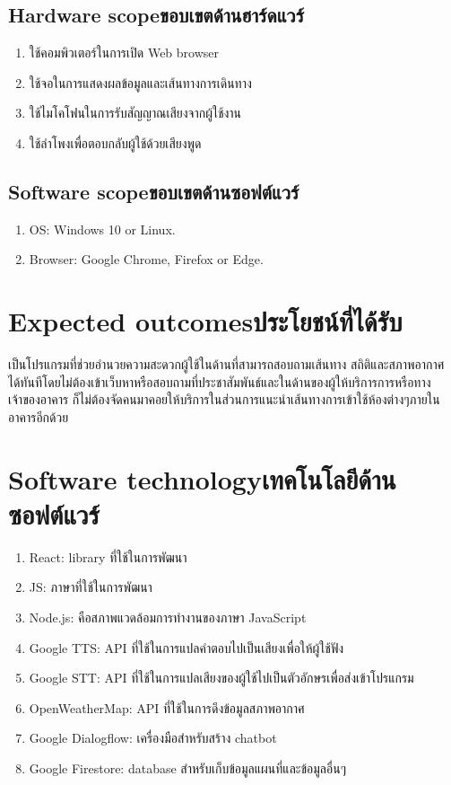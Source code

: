 \subsection{\ifenglish Hardware scope\else ขอบเขตด้านฮาร์ดแวร์\fi}
\begin{enumerate}
    \item ใช้คอมพิวเตอร์ในการเปิด Web browser
    \item ใช้จอในการแสดงผลข้อมูลและเส้นทางการเดินทาง
    \item ใช้ไมโคโฟนในการรับสัญญาณเสียงจากผู้ใช้งาน
    \item ใช้ลำโพงเพื่อตอบกลับผู้ใช้ด้วยเสียงพูด
\end{enumerate}

\subsection{\ifenglish Software scope\else ขอบเขตด้านซอฟต์แวร์\fi}
\begin{enumerate}
    \item OS: Windows 10 or Linux.
    \item Browser: Google Chrome, Firefox or Edge.
\end{enumerate}

\section{\ifenglish Expected outcomes\else ประโยชน์ที่ได้รับ\fi}
เป็นโปรแกรมที่ช่วยอำนวยความสะดวกผู้ใช้ในด้านที่สามารถสอบถามเส้นทาง สถิติและสภาพอากาศ 
ได้ทันทีโดยไม่ต้องเข้าเว็บหาหรือสอบถามที่ประชาสัมพันธ์และในด้านของผู้ให้บริการการหรือทางเจ้าของอาคาร
ก็ไม่ต้องจัดคนมาคอยให้บริการในส่วนการแนะนำเส้นทางการเข้าใช้ห้องต่างๆภายในอาคารอีกด้วย

\section{\ifenglish Software technology\else เทคโนโลยีด้านซอฟต์แวร์\fi}
\begin{enumerate}
    \item React: library ที่ใช้ในการพัฒนา
    \item JS: ภาษาที่ใช้ในการพัฒนา
    \item Node.js: คือสภาพแวดล้อมการทำงานของภาษา JavaScript
    \item Google TTS: API ที่ใช้ในการแปลคำตอบไปเป็นเสียงเพื่อให้ผู้ใช้ฟัง
    \item Google STT: API ที่ใช้ในการแปลเสียงของผู้ใช้ไปเป็นตัวอักษรเพื่อส่งเข้าโปรแกรม
    \item OpenWeatherMap: API ที่ใช้ในการดึงข้อมูลสภาพอากาศ
    \item Google Dialogflow: เครื่องมือสำหรับสร้าง chatbot
    \item Google Firestore: database สำหรับเก็บข้อมูลแผนที่และข้อมูลอื่นๆ
\end{enumerate}

